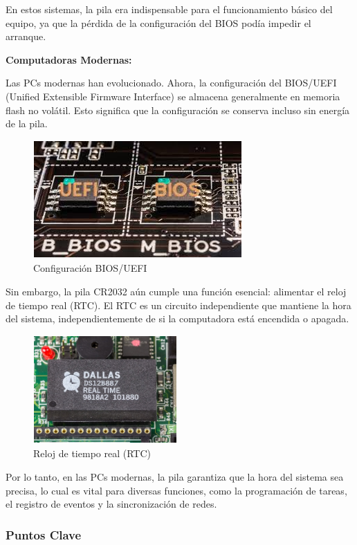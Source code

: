 En estos sistemas, la pila era indispensable para el funcionamiento básico del equipo, ya que la pérdida de la configuración del BIOS podía impedir el arranque.

\textbf{Computadoras Modernas:}

Las PCs modernas han evolucionado. Ahora, la configuración del BIOS/UEFI (Unified Extensible Firmware Interface) se almacena generalmente en memoria flash no volátil. Esto significa que la configuración se conserva incluso sin energía de la pila.

\begin{figure}
  \centering
  \includegraphics[scale=0.9]{imagenes/uefi-bios.png}
  \caption{Configuración BIOS/UEFI}
\end{figure}

Sin embargo, la pila CR2032 aún cumple una función esencial: alimentar el reloj de tiempo real (RTC). El RTC es un circuito independiente que mantiene la hora del sistema, independientemente de si la computadora está encendida o apagada.

\begin{figure}
  \centering
  \includegraphics{imagenes/reloj.png}
  \caption{Reloj de tiempo real (RTC)}
\end{figure}

Por lo tanto, en las PCs modernas, la pila garantiza que la hora del sistema sea precisa, lo cual es vital para diversas funciones, como la programación de tareas, el registro de eventos y la sincronización de redes.

\subsubsection{Puntos Clave}

